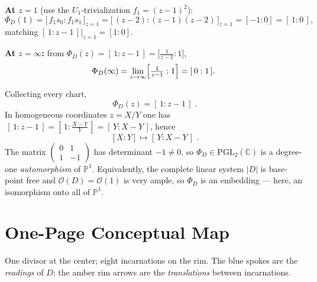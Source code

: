 \documentclass[11pt]{article}
\newcommand{\PP}{\mathbb P}
\newcommand{\CC}{\mathbb C}
\newcommand{\OO}{\mathcal O}
\theoremstyle{definition}
\theoremstyle{plain}
\begin{document}
\medskip
\noindent\textbf{At \(z=1\)} (use the \(U_1\)-trivialization \(f_1=(z-1)^2\)):
\[
  \Phi_D(1)=\bigl[\,f_1 s_0:f_1 s_1\,\bigr]_{z=1}
  =\bigl[\,(z-2):(z-1)(z-2)\,\bigr]_{z=1}
  =[-1:0]=[\,1:0\,],
\]
matching \([\,1:z-1\,]\big|_{z=1}=[1:0]\).

\medskip
\noindent\textbf{At \(z=\infty\):} from \(\Phi_D(z)=[\,1:z-1\,]=\bigl[\tfrac{1}{z-1}:1\bigr]\),
\[
  \Phi_D(\infty)=\lim_{z\to\infty}\Bigl[\tfrac{1}{z-1}:1\Bigr]=[\,0:1\,].
\]

\noindent
Collecting every chart,
\[
  \boxed{\;\Phi_D(z)=[\,1:z-1\,]\;}.
\]
In homogeneous coordinates \(z=X/Y\) one has
\(\,[\,1:z-1\,]=[\,1:\tfrac{X-Y}{Y}\,]=[\,Y:X-Y\,]\), hence
\[
  \boxed{\;[X:Y]\longmapsto[\,Y:X-Y\,]\;}.
\]
The matrix \(\left(\begin{smallmatrix}0&1\\ 1&-1\end{smallmatrix}\right)\) has
determinant \(-1\neq0\), so \(\Phi_D\in\mathrm{PGL}_2(\CC)\) is a degree-one
\emph{automorphism} of \(\PP^1\). Equivalently, the complete linear system
\(|D|\) is base-point free and \(\OO(D)=\OO(1)\) is very ample, so \(\Phi_D\) is
an embedding --- here, an isomorphism onto all of \(\PP^1\).

\clearpage
\section{One-Page Conceptual Map}
\noindent
One divisor at the center; eight incarnations on the rim. The blue spokes are
the \emph{readings} of \(D\); the amber rim arrows are the \emph{translations}
between incarnations.
\end{document}
